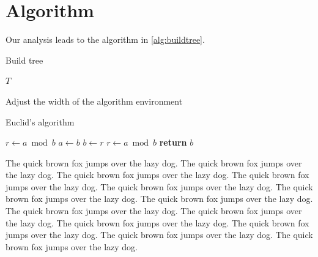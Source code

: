 \documentclass[openany,twoside,12pt]{book}
\theoremstyle{plain}
\numberwithin{equation}{chapter}
\numberwithin{figure}{chapter}
\numberwithin{table}{chapter}
\begin{document}
\section{Algorithm}
\label{sec:alg}

Our analysis leads to the algorithm in \ref{alg:buildtree}.

\begin{algorithm}
\caption{Build tree}
\label{alg:buildtree}
\begin{algorithmic}
  \EndWhile
  \State \Return $T$
\end{algorithmic}
\end{algorithm}

Adjust the width of the algorithm environment
\begin{center}
\vspace{-2ex}
\begin{minipage}{0.9\linewidth}
\begin{algorithm}[H]
\caption{Euclid's algorithm}
\label{alg:euclid}
\begin{algorithmic}[1] %
  \State $r \gets a \bmod b$
    \State $a \gets b$
    \State $b \gets r$
    \State $r \gets a \bmod b$
  \EndWhile\label{euclidendwhile}
  \State \textbf{return} $b$
\EndProcedure
\end{algorithmic}
\end{algorithm}
\end{minipage}
\end{center}


The quick brown fox jumps over the lazy dog. The quick brown fox jumps over the lazy dog. The quick brown fox jumps over the lazy dog. The quick brown fox jumps over the lazy dog. The quick brown fox jumps over the lazy dog. The quick brown fox jumps over the lazy dog. The quick brown fox jumps over the lazy dog. The quick brown fox jumps over the lazy dog. The quick brown fox jumps over the lazy dog. The quick brown fox jumps over the lazy dog. The quick brown fox jumps over the lazy dog. The quick brown fox jumps over the lazy dog. The quick brown fox jumps over the lazy dog.
\end{document}
